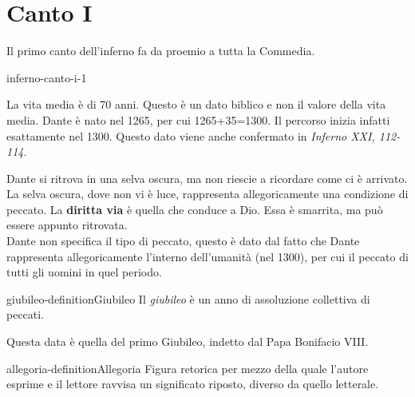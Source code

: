 \documentclass[preview]{standalone}
\begin{document}
\genpage

\section{Canto I}

\begin{plainhtml}
    Il primo canto dell'inferno fa da proemio a tutta la Commedia.
\end{plainhtml}

\begin{snippet}{inferno-canto-i-1}

    La vita media è di 70 anni. Questo è un dato biblico e non il valore della vita media.
    Dante è nato nel 1265, per cui 1265+35=1300. Il percorso inizia infatti esattamente nel 1300.
    Questo dato viene anche confermato in \textit{Inferno XXI, 112-114}.

    Dante si ritrova in una selva oscura, ma non riescie a ricordare come ci è arrivato. 
    La selva oscura, dove non vi è luce, rappresenta allegoricamente una condizione di peccato.
    La \textbf{diritta via} è quella che conduce a Dio.
    Essa è smarrita, ma può essere appunto ritrovata.
    \\
    Dante non specifica il tipo di peccato, questo è dato dal fatto che Dante rappresenta allegoricamente
    l'interno dell'umanità (nel 1300), per cui il peccato di tutti gli uomini in quel periodo.
\end{snippet}

\begin{snippetdefinition}{giubileo-definition}{Giubileo}
    Il \textit{giubileo} è un anno di assoluzione collettiva di peccati.
\end{snippetdefinition}

\begin{plainhtml}
    Questa data è quella del primo Giubileo, indetto dal Papa Bonifacio VIII.
\end{plainhtml}

\begin{snippetdefinition}{allegoria-definition}{Allegoria}
    Figura retorica per mezzo della quale l'autore esprime e il lettore ravvisa un significato riposto,
    diverso da quello letterale.
\end{snippetdefinition}
\end{document}
